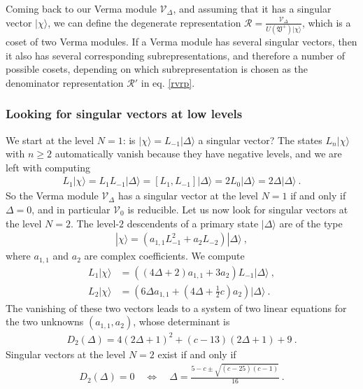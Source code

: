 \documentclass[12pt, a4paper, notitlepage, twoside]{report}
\numberwithin{equation}{section}
\theoremstyle{break}
\begin{document}
Coming back to our Verma module $\mathcal{V}_\Delta$, and assuming that it has a singular vector $|\chi\rangle$, we can define the degenerate representation $\mathcal{R} = \frac{\mathcal{V}_\Delta}{U(\mathfrak{V}^+)|\chi\rangle}$, which is a coset of two Verma modules.
If a Verma module has several singular vectors, then it also has several corresponding subrepresentations, and therefore a number of possible cosets, depending on which subrepresentation is chosen as the denominator representation $\mathcal{R}'$ in eq. \eqref{rvrp}.

\subsubsection{Looking for singular vectors at low levels}

We start at the level $N=1$: is $|\chi\rangle=L_{-1}|\Delta\rangle$ a singular vector? The states $L_n|\chi\rangle$ with $n\geq 2$ automatically vanish because they have negative levels, and we are left with computing
\begin{align}
 L_1|\chi\rangle = L_1 L_{-1}|\Delta\rangle = [L_1,L_{-1}]|\Delta\rangle = 2L_0 |\Delta\rangle = 2\Delta|\Delta\rangle\ .
\end{align}
So the Verma module $\mathcal{V}_\Delta$ has a singular vector at the level $N=1$ if and only if $\Delta = 0$, and in particular $\mathcal{V}_0$ is reducible.
Let us now look for singular vectors at the level $N=2$.
The level-$2$ descendents of a primary state $|\Delta\rangle$ are of the type
\begin{align}
 |\chi\rangle = \left(a_{1,1} L_{-1}^2 + a_2 L_{-2}\right) |\Delta\rangle\ ,
\end{align}
where $a_{1,1}$ and $a_2$ are complex coefficients.
We compute 
\begin{align}
 L_1|\chi\rangle &= \left((4\Delta+2)a_{1,1} + 3a_2\right) L_{-1}|\Delta\rangle\ ,
\\
L_2 |\chi \rangle &= \left(6\Delta a_{1,1}+(4\Delta+\tfrac12 c) a_2\right)|\Delta\rangle\ .
\end{align}
The vanishing of these two vectors leads to a system of two linear equations for the two unknowns $(a_{1,1},a_2)$, whose determinant is 
\begin{align}
 D_2(\Delta) = 4(2\Delta+1)^2 +(c-13)(2\Delta+1) +9\ . 
\label{dud}
\end{align}
Singular vectors at the level $N=2$ exist if and only if
\begin{align}
D_2(\Delta)=0 \quad \iff \quad \Delta = \frac{5-c\pm \sqrt{(c-25)(c-1)}}{16}\ .
\label{dcscc}
\end{align}
\end{document}
